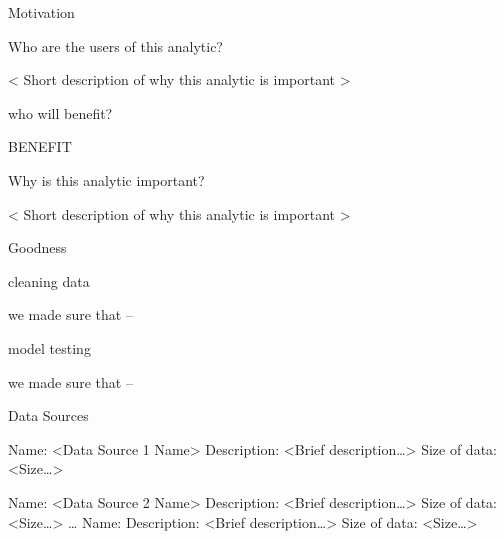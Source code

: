 \documentclass[10pt,ignorenonframetext,]{beamer}
\begin{document}
\begin{frame}{%
\protect\hypertarget{motivation}{%
Motivation}}

\begin{block}{Who are the users of this analytic?}

\textless{} Short description of why this analytic is important
\textgreater{}

\end{block}

\begin{block}{who will benefit?}

BENEFIT

\end{block}

\begin{block}{Why is this analytic important?}

\textless{} Short description of why this analytic is important
\textgreater{}

\end{block}

\end{frame}

\begin{frame}{%
\protect\hypertarget{goodness}{%
Goodness}}

\begin{block}{cleaning data}

we made sure that –

\end{block}

\begin{block}{model testing}

we made sure that –

\end{block}

\end{frame}

\begin{frame}{%
\protect\hypertarget{data-sources}{%
Data Sources}}

Name: \textless{}Data Source 1 Name\textgreater{} Description:
\textless{}Brief description\ldots{}\textgreater{} Size of data:
\textless{}Size\ldots{}\textgreater{}

Name: \textless{}Data Source 2 Name\textgreater{} Description:
\textless{}Brief description\ldots{}\textgreater{} Size of data:
\textless{}Size\ldots{}\textgreater{} \ldots{} Name: Description:
\textless{}Brief description\ldots{}\textgreater{} Size of data:
\textless{}Size\ldots{}\textgreater{}

\end{frame}
\end{document}
